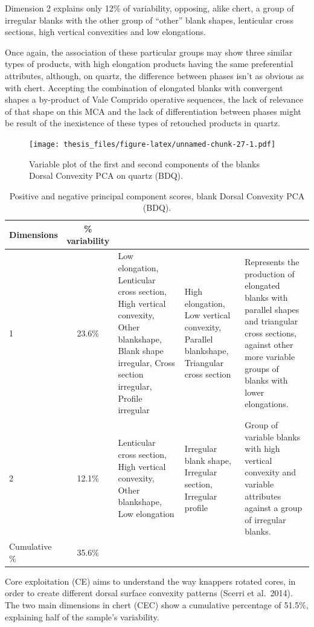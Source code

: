 \documentclass[12pt,twoside]{reedthesis}
\begin{document}
Dimension 2 explains only 12\% of variability, opposing, alike chert, a group of irregular blanks with the other group of ``other'' blank shapes, lenticular cross sections, high vertical convexities and low elongations.

Once again, the association of these particular groups may show three similar types of products, with high elongation products having the same preferential attributes, although, on quartz, the difference between phases isn't as obvious as with chert.
Accepting the combination of elongated blanks with convergent shapes a by-product of Vale Comprido operative sequences, the lack of relevance of that shape on this MCA and the lack of differentiation between phases might be result of the inexistence of these types of retouched products in quartz.
\begin{figure}
\centering
\texttt{[image: thesis\_files/figure-latex/unnamed-chunk-27-1.pdf]}
\caption{\label{fig:unnamed-chunk-27}Variable plot of the first and second components of the blanks Dorsal Convexity PCA on quartz (BDQ).}
\end{figure}
\begin{table}[!h]

\caption{\label{tab:unnamed-chunk-28}Positive and negative principal component scores, blank Dorsal Convexity PCA (BDQ).}
\centering
\begin{tabular}[t]{lc>{\raggedright\arraybackslash}p{3cm}>{\raggedright\arraybackslash}p{3cm}>{\raggedright\arraybackslash}p{3cm}}
\toprule
\multicolumn{1}{c}{\textbf{Dimensions}} & \multicolumn{1}{c}{\textbf{\% variability}} & \multicolumn{1}{>{\centering\arraybackslash}p{3cm}}{\textbf{+}} & \multicolumn{1}{>{\centering\arraybackslash}p{3cm}}{\textbf{-}} & \multicolumn{1}{>{\centering\arraybackslash}p{3cm}}{\textbf{Interpretation}}\\
\midrule
1 & 23.6\% & Low elongation, Lenticular cross section, High vertical convexity, Other blankshape,
                              Blank shape irregular, Cross section irregular, Profile irregular & High elongation, Low vertical convexity, Parallel blankshape, Triangular cross section & Represents the production of elongated blanks with parallel shapes and triangular cross sections,
                               against other more variable groups of blanks with lower elongations.\\
2 & 12.1\% & Lenticular cross section, High vertical convexity, Other blankshape, Low elongation & Irregular blank shape, Irregular section, Irregular profile & Group of variable blanks with high vertical convexity and variable attributes against a group of irregular blanks.\\
Cumulative \% & 35.6\% &  &  & \\
\bottomrule
\end{tabular}
\end{table}
Core exploitation (CE) aims to understand the way knappers rotated cores, in order to create different dorsal surface convexity patterns (Scerri et al.~2014). The two main dimensions in chert (CEC) show a cumulative percentage of 51.5\%, explaining half of the sample's variability.
\end{document}
